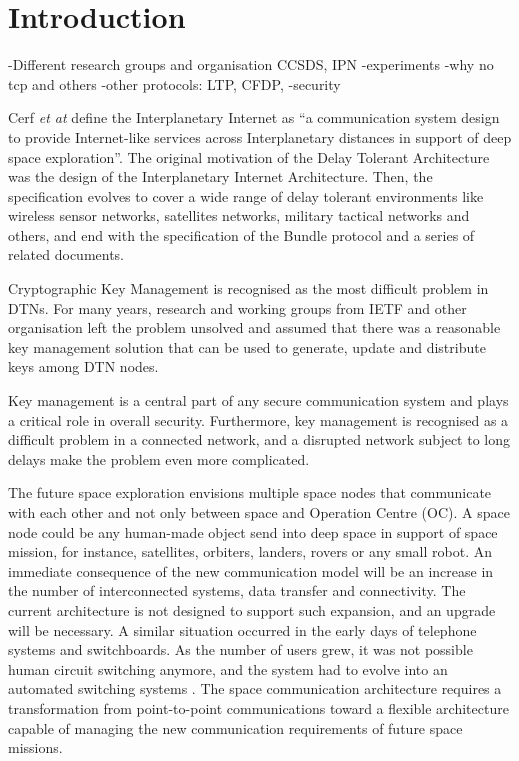 \section{Introduction}


-Different research groups and organisation CCSDS, IPN
-experiments
-why no tcp and others
-other protocols: LTP, CFDP, 
-security


Cerf \textit{et at} \cite{cerf2007delay} define the Interplanetary Internet as ``a communication system design to provide Internet-like services across Interplanetary distances in support of deep space exploration''. The original motivation of the Delay Tolerant Architecture was the design of the Interplanetary Internet Architecture. Then, the specification evolves to cover a wide range of delay tolerant environments like wireless sensor networks, satellites networks, military tactical networks and others, and end with the specification of the Bundle protocol \cite{scott2007bundle} and a series of related documents. 


Cryptographic Key Management is recognised as the most difficult problem in DTNs. For many years, research and working groups from IETF and other organisation left the problem unsolved and assumed that there was a reasonable key management solution that can be used to generate, update and distribute keys among DTN nodes. 

Key management is a central part of any secure communication system and plays a critical role in overall security. Furthermore, key management is recognised as a difficult problem in a connected network, and a disrupted network subject to long delays make the problem even more complicated.  


The future space exploration envisions multiple space nodes that communicate with each other and not only between space and Operation Centre (OC). A space node could be any human-made object send into deep space in support of space mission, for instance, satellites, orbiters, landers, rovers or any small robot. An immediate consequence of the new communication model will be an increase in the number of interconnected systems, data transfer and connectivity. The current architecture is not designed to support such expansion, and an upgrade will be necessary. A similar situation occurred in the early days of telephone systems and switchboards. As the number of users grew, it was not possible human circuit switching anymore, and the system had to evolve into an automated switching systems \cite{rationale2010requirements}. The space communication architecture requires a transformation from point-to-point communications toward a flexible architecture capable of managing the new communication requirements of future space missions. 

